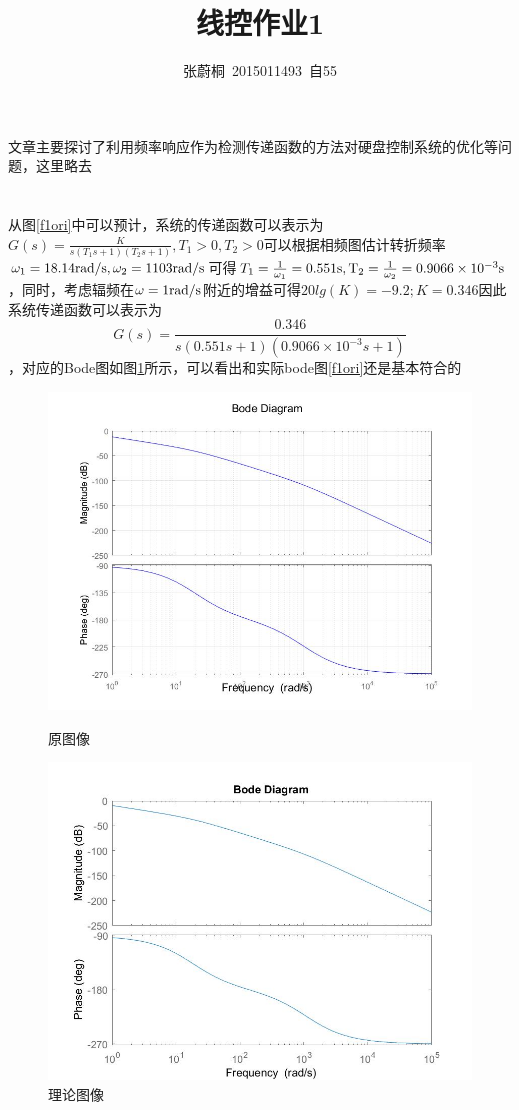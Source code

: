 \documentclass[UTF8,a4paper]{ctexart}
\title{线控作业1}
\author{张蔚桐\ 2015011493\ 自55}
\begin{document}
\maketitle
\section{}
文章主要探讨了利用频率响应作为检测传递函数的方法对硬盘控制系统的优化等问题，这里略去
\section{}
从图\ref{f1ori}中可以预计，系统的传递函数可以表示为$G(s)=\frac{K}{s(T_1s+1)(T_2s+1)},T_1>0,T_2>0$可以根据相频图估计转折频率$\omega_1=18.14\rm{rad/s},\omega_2=1103\rm{rad/s}$可得$T_1=\frac{1}{\omega_1}=0.551\rm{s},T_2=\frac{1}{\omega_2}=0.9066\times 10^{-3}\rm{s}$，同时，考虑辐频在$\omega=1\rm{rad/s}$附近的增益可得$20lg(K)=-9.2;K=0.346$因此系统传递函数可以表示为$$G(s)=\frac{0.346}{s(0.551s+1)(0.9066\times 10^{-3}s+1)}$$，对应的Bode图如图\ref{f1the}所示，可以看出和实际bode图\ref{f1ori}还是基本符合的
\begin{figure}
\centering
\includegraphics[width=\textwidth]{motorG.jpg}
\caption{原图像}
\label{f1ori}
\includegraphics[width=\textwidth]{RmotorG.jpg}
\caption{理论图像}
\label{f1the}
\end{figure}
\end{document}
